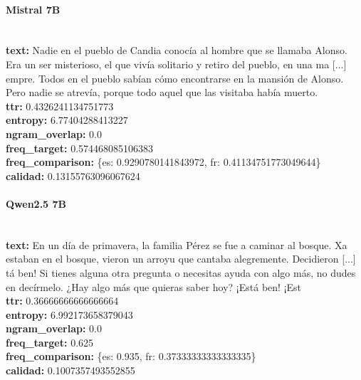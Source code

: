 \paragraph{Mistral 7B}~\\
\textbf{text:} Nadie en el pueblo de Candia conocía al hombre que se llamaba Alonso. Era un ser misterioso, el que vivía solitario y retiro del pueblo, en una ma [...] empre. Todos en el pueblo sabían cómo encontrarse en la mansión de Alonso. Pero nadie se atrevía, porque todo aquel que las visitaba había muerto.\\
\textbf{ttr:} 0.4326241134751773\\
\textbf{entropy:} 6.77404288413227\\
\textbf{ngram\_overlap:} 0.0\\
\textbf{freq\_target:} 0.574468085106383\\
\textbf{freq\_comparison:} \{\textquotesingle{}es\textquotesingle{}: 0.9290780141843972, \textquotesingle{}fr\textquotesingle{}: 0.41134751773049644\}\\
\textbf{calidad:} 0.13155763096067624\\

\paragraph{Qwen2.5 7B}~\\
\textbf{text:} En un día de primavera, la familia Pérez se fue a caminar al bosque. Xa estaban en el bosque, vieron un arroyu que cantaba alegremente. Decidieron [...] tá ben! Si tienes alguna otra pregunta o necesitas ayuda con algo más, no dudes en decírmelo. ¿Hay algo más que quieras saber hoy? ¡Está ben! ¡Est\\
\textbf{ttr:} 0.36666666666666664\\
\textbf{entropy:} 6.992173658379043\\
\textbf{ngram\_overlap:} 0.0\\
\textbf{freq\_target:} 0.625\\
\textbf{freq\_comparison:} \{\textquotesingle{}es\textquotesingle{}: 0.935, \textquotesingle{}fr\textquotesingle{}: 0.37333333333333335\}\\
\textbf{calidad:} 0.1007357493552855\\

